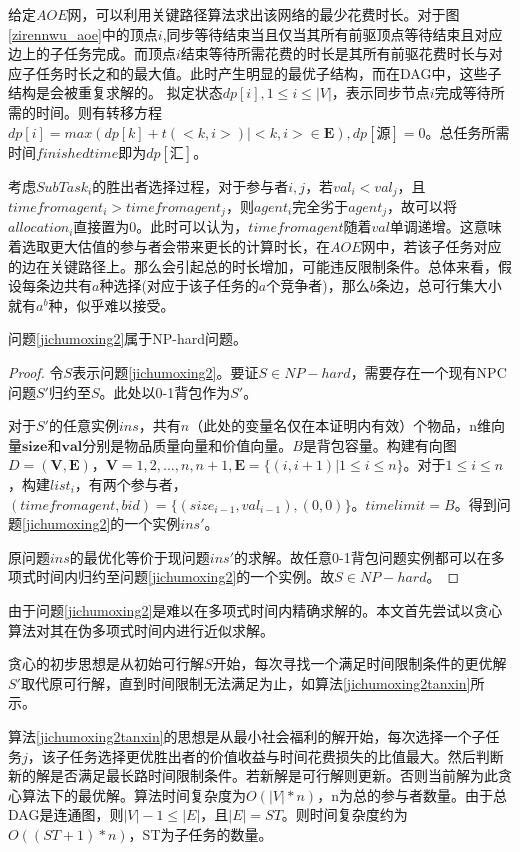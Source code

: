\documentclass[promaster]{thesis-uestc}
\begin{document}
给定$AOE$网，可以利用关键路径算法求出该网络的最少花费时长。对于图\ref{zirennwu_aoe}中的顶点$i$,同步等待结束当且仅当其所有前驱顶点等待结束且对应边上的子任务完成。而顶点$i$结束等待所需花费的时长是其所有前驱花费时长与对应子任务时长之和的最大值。此时产生明显的最优子结构，而在DAG中，这些子结构是会被重复求解的。
拟定状态$dp[i],1 \leq i\leq |V|$，表示同步节点$i$完成等待所需的时间。则有转移方程$dp[i] = max(dp[k]+t(<k,i>)|<k,i> \in \mathbf{E}),dp[\text{源}] = 0$。总任务所需时间$finishedtime$即为$dp[\text{汇}]$。


考虑$SubTask_i$的胜出者选择过程，对于参与者$i,j$，若$val_i < val_j$，且$timefromagent_i > timefromagent_j$，则$agent_i$完全劣于$agent_j$，故可以将$allocation_i$直接置为0。此时可以认为，$timefromagent$随着$val$单调递增。这意味着选取更大估值的参与者会带来更长的计算时长，在$AOE$网中，若该子任务对应的边在关键路径上。那么会引起总的时长增加，可能违反限制条件。总体来看，假设每条边共有$a$种选择(对应于该子任务的$a$个竞争者)，那么$b$条边，总可行集大小就有$a^b$种，似乎难以接受。

\begin{theorem}
   问题\ref{jichumoxing2}属于NP-hard问题。
\end{theorem}

\begin{proof}
    令$S$表示问题\ref{jichumoxing2}。要证$S\in NP-hard$，需要存在一个现有NPC问题$S'$归约至$S$。此处以0-1背包作为$S'$。

    对于$S'$的任意实例$ins$，共有$n$（此处的变量名仅在本证明内有效）个物品，n维向量$\mathbf{size}$和$\mathbf{val}$分别是物品质量向量和价值向量。$B$是背包容量。构建有向图$D=(\mathbf{V},\mathbf{E})$，$\mathbf{V} = {1,2,...,n,n+1},\mathbf{E} = \{(i,i+1)|1 \leq i \leq n\}$。对于$1 \leq i \leq n$，构建$list_i$，有两个参与者，$(timefromagent,bid) = \{(size_{i-1},val_{i-1}),(0,0)\}$。$timelimit = B$。得到问题\ref{jichumoxing2}的一个实例$ins'$。

    原问题$ins$的最优化等价于现问题$ins'$的求解。故任意0-1背包问题实例都可以在多项式时间内归约至问题\ref{jichumoxing2}的一个实例。故$S\in NP-hard$。
\end{proof}

由于问题\ref{jichumoxing2}是难以在多项式时间内精确求解的。本文首先尝试以贪心算法对其在伪多项式时间内进行近似求解。

贪心的初步思想是从初始可行解$S$开始，每次寻找一个满足时间限制条件的更优解$S'$取代原可行解，直到时间限制无法满足为止，如算法\ref{jichumoxing2tanxin}所示。

算法\ref{jichumoxing2tanxin}的思想是从最小社会福利的解开始，每次选择一个子任务$j$，该子任务选择更优胜出者的价值收益与时间花费损失的比值最大。然后判断新的解是否满足最长路时间限制条件。若新解是可行解则更新。否则当前解为此贪心算法下的最优解。算法时间复杂度为$O(|V|*n)$，n为总的参与者数量。由于总DAG是连通图，则$|V|- 1\leq |E|$，且$|E| = ST$。则时间复杂度约为$O((ST+1)*n)$，ST为子任务的数量。
\end{document}

